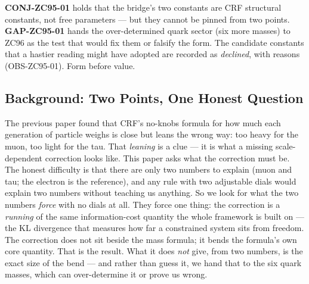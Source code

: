 \documentclass[12pt, a4paper]{article}
\begin{document}
\textbf{CONJ-ZC95-01} holds that the bridge's two constants are CRF structural
constants, not free parameters --- but they cannot be pinned from two points.
\textbf{GAP-ZC95-01} hands the over-determined quark sector (six more masses)
to ZC96 as the test that would fix them or falsify the form. The candidate
constants that a hastier reading might have adopted are recorded as
\emph{declined}, with reasons (OBS-ZC95-01). Form before value.


\subsection{Background: Two Points, One Honest Question}
\label{sec:background-zc95}

\begin{keybox}[title={If you are just arriving --- ZC95 in plain language}]
\sloppy
The previous paper found that CRF's no-knobs formula for how much each
generation of particle weighs is close but leans the wrong way: too heavy for
the muon, too light for the tau. That \emph{leaning} is a clue --- it is what a
missing scale-dependent correction looks like. This paper asks what the
correction must be. The honest difficulty is that there are only two numbers to
explain (muon and tau; the electron is the reference), and any rule with two
adjustable dials would explain two numbers without teaching us anything. So we
look for what the two numbers \emph{force} with no dials at all. They force one
thing: the correction is a \emph{running} of the same information-cost quantity
the whole framework is built on --- the KL divergence that measures how far a
constrained system sits from freedom. The correction does not sit beside the
mass formula; it bends the formula's own core quantity. That is the result.
What it does \emph{not} give, from two numbers, is the exact size of the bend ---
and rather than guess it, we hand that to the six quark masses, which can
over-determine it or prove us wrong.
\end{keybox}
\end{document}
